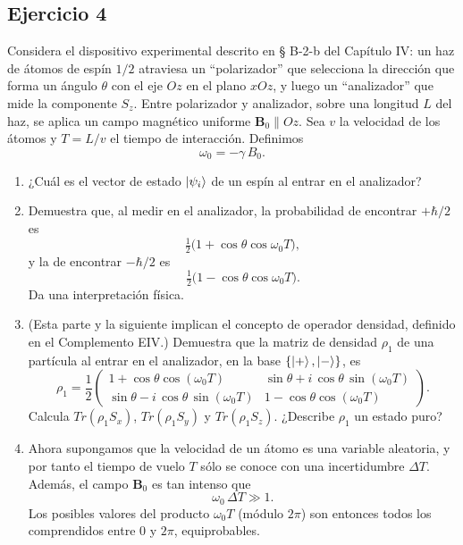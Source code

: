 \documentclass[a4paper,11pt]{article}
\begin{document}
\subsection*{Ejercicio 4}
Considera el dispositivo experimental descrito en § B-2-b del Capítulo IV: un haz de átomos de espín \(1/2\) atraviesa un “polarizador” que selecciona la dirección que forma un ángulo \(\theta\) con el eje \(Oz\) en el plano \(xOz\), y luego un “analizador” que mide la componente \(S_z\). Entre polarizador y analizador, sobre una longitud \(L\) del haz, se aplica un campo magnético uniforme \(\mathbf{B}_0\parallel Oz\). Sea \(v\) la velocidad de los átomos y \(T=L/v\) el tiempo de interacción. Definimos
\[
\omega_0 = -\gamma\,B_0.
\]

\begin{enumerate}
  \item ¿Cuál es el vector de estado \(\ket{\psi_i}\) de un espín al entrar en el analizador?
  \item Demuestra que, al medir en el analizador, la probabilidad de encontrar \(+\hbar/2\) es
  \[
    \tfrac12\bigl(1+\cos\theta\cos\omega_0 T\bigr),
  \]
  y la de encontrar \(-\hbar/2\) es
  \[
    \tfrac12\bigl(1-\cos\theta\cos\omega_0 T\bigr).
  \]
  Da una interpretación física.
  \item (Esta parte y la siguiente implican el concepto de operador densidad, definido en el Complemento EIV.) Demuestra que la matriz de densidad \(\rho_1\) de una partícula al entrar en el analizador, en la base \(\{\ket{+},\ket{-}\}\), es
  \[
    \rho_1 = \frac12
    \begin{pmatrix}
      1 + \cos\theta\cos(\omega_0 T)                  & \sin\theta + i\,\cos\theta\,\sin(\omega_0 T) \\[6pt]
      \sin\theta - i\,\cos\theta\,\sin(\omega_0 T)     & 1 - \cos\theta\cos(\omega_0 T)
    \end{pmatrix}.
  \]
  Calcula \( Tr(\rho_1 S_x)\), \( Tr(\rho_1 S_y)\) y \( Tr(\rho_1 S_z)\). ¿Describe \(\rho_1\) un estado puro?

\item Ahora supongamos que la velocidad de un átomo es una variable aleatoria, y por tanto el tiempo de vuelo \(T\) sólo se conoce con una incertidumbre \(\Delta T\). Además, el campo \(\mathbf{B}_0\) es tan intenso que 
\[
\omega_0\,\Delta T \gg 1.
\]
Los posibles valores del producto \(\omega_0 T\) (módulo \(2\pi\)) son entonces todos los comprendidos entre \(0\) y \(2\pi\), equiprobables.


\end{enumerate}
\end{document}
